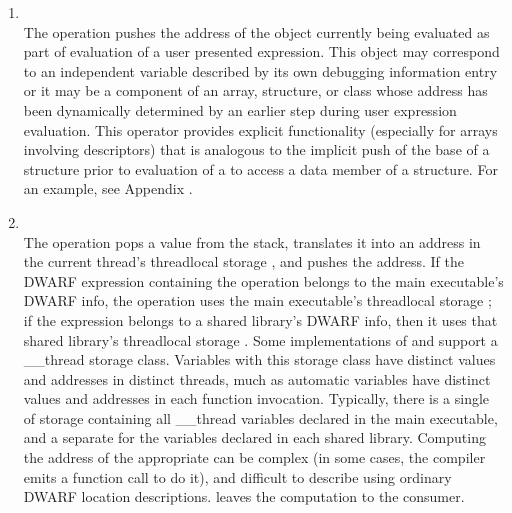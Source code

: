 \begin{enumerate}[1]
\item {}\\
The  operation pushes the address
of the object currently being evaluated as part of evaluation
of a user presented expression. This object may correspond
to an independent variable described by its own debugging
information entry or it may be a component of an array,
structure, or class whose address has been dynamically
determined by an earlier step during user expression
evaluation.  This operator provides explicit functionality
(especially for arrays involving descriptors) that is analogous
to the implicit push of the base 
of a structure prior
to evaluation of a  to access a
data member of a structure. For an example, see 
Appendix .

\item {} \\
The  operation pops a value from the
stack, translates it into an address in the current thread's
thread\dash local storage , and pushes the address. If the
DWARF expression containing 
the 
operation belongs to the main executable's DWARF info, the
operation uses the main executable's thread\dash local storage
; if the expression belongs to a shared library's
DWARF info, then it uses that shared library's thread\dash local
storage .  Some implementations of 
 and  support a
\_\_thread storage class. Variables with this storage class
have distinct values and addresses in distinct threads, much
as automatic variables have distinct values and addresses in
each function invocation. Typically, there is a single 
of storage containing all \_\_thread variables declared in
the main executable, and a separate  for the variables
declared in each shared library. Computing the address of
the appropriate  can be complex (in some cases, the
compiler emits a function call to do it), and difficult
to describe using ordinary DWARF location descriptions.
 leaves the computation to the
consumer.


\end{enumerate}
